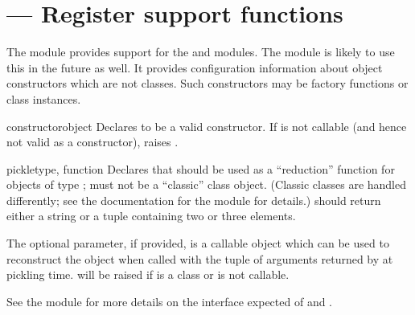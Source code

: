 \section{ ---
         Register  support functions}



The  module provides support for the
 and
 modules.  The
 module is likely to use this in the
future as well.  It provides configuration information about object
constructors which are not classes.  Such constructors may be factory
functions or class instances.


\begin{funcdesc}{constructor}{object}
  Declares  to be a valid constructor.  If  is
  not callable (and hence not valid as a constructor), raises
  .
\end{funcdesc}

\begin{funcdesc}{pickle}{type, function}
  Declares that  should be used as a ``reduction''
  function for objects of type ;  must not be a
  ``classic'' class object.  (Classic classes are handled differently;
  see the documentation for the  module for
  details.)   should return either a string or a tuple
  containing two or three elements.

  The optional  parameter, if provided, is a
  callable object which can be used to reconstruct the object when
  called with the tuple of arguments returned by  at
  pickling time.   will be raised if
   is a class or  is not callable.

  See the  module for more
  details on the interface expected of  and
  .
\end{funcdesc}
